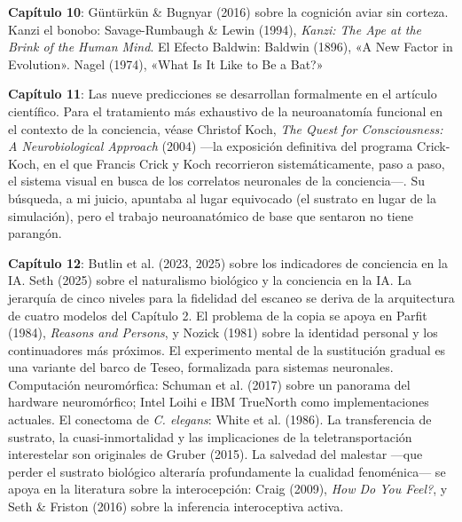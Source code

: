 \documentclass[11pt, twoside, openright]{book}
\begin{document}
\textbf{Capítulo 10}: Güntürkün \& Bugnyar (2016) sobre la cognición aviar sin corteza. Kanzi el bonobo: Savage-Rumbaugh \& Lewin (1994), \textit{Kanzi: The Ape at the Brink of the Human Mind}. El Efecto Baldwin: Baldwin (1896), «A New Factor in Evolution». Nagel (1974), «What Is It Like to Be a Bat?»

\textbf{Capítulo 11}: Las nueve predicciones se desarrollan formalmente en el artículo científico. Para el tratamiento más exhaustivo de la neuroanatomía funcional en el contexto de la conciencia, véase Christof Koch, \textit{The Quest for Consciousness: A Neurobiological Approach} (2004) ---la exposición definitiva del programa Crick-Koch, en el que Francis Crick y Koch recorrieron sistemáticamente, paso a paso, el sistema visual en busca de los correlatos neuronales de la conciencia---. Su búsqueda, a mi juicio, apuntaba al lugar equivocado (el sustrato en lugar de la simulación), pero el trabajo neuroanatómico de base que sentaron no tiene parangón.

\textbf{Capítulo 12}: Butlin et al. (2023, 2025) sobre los indicadores de conciencia en la IA. Seth (2025) sobre el naturalismo biológico y la conciencia en la IA. La jerarquía de cinco niveles para la fidelidad del escaneo se deriva de la arquitectura de cuatro modelos del Capítulo 2. El problema de la copia se apoya en Parfit (1984), \textit{Reasons and Persons}, y Nozick (1981) sobre la identidad personal y los continuadores más próximos. El experimento mental de la sustitución gradual es una variante del barco de Teseo, formalizada para sistemas neuronales. Computación neuromórfica: Schuman et al. (2017) sobre un panorama del hardware neuromórfico; Intel Loihi e IBM TrueNorth como implementaciones actuales. El conectoma de \textit{C. elegans}: White et al. (1986). La transferencia de sustrato, la cuasi-inmortalidad y las implicaciones de la teletransportación interestelar son originales de Gruber (2015). La salvedad del malestar ---que perder el sustrato biológico alteraría profundamente la cualidad fenoménica--- se apoya en la literatura sobre la interocepción: Craig (2009), \textit{How Do You Feel?}, y Seth \& Friston (2016) sobre la inferencia interoceptiva activa.
\end{document}
